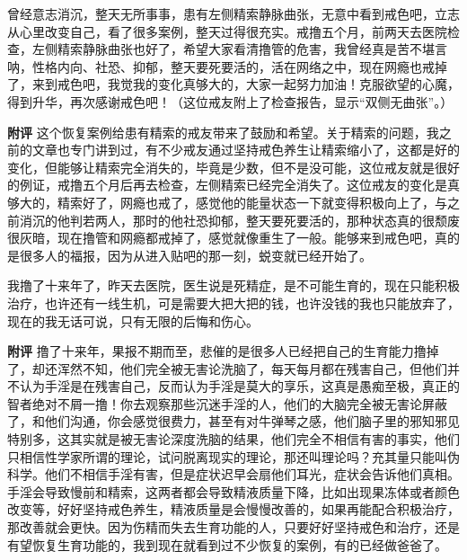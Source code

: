 \begin{case}
    曾经意志消沉，整天无所事事，患有左侧精索静脉曲张，无意中看到戒色吧，立志从心里改变自己，看了很多案例，整天过得很充实。戒撸五个月，前两天去医院检查，左侧精索静脉曲张也好了，希望大家看清撸管的危害，我曾经真是苦不堪言呐，性格内向、社恐、抑郁，整天要死要活的，活在网络之中，现在网瘾也戒掉了，来到戒色吧，我觉我的变化真够大的，大家一起努力加油！克服欲望的心魔，得到升华，再次感谢戒色吧！（这位戒友附上了检查报告，显示“双侧无曲张”。）

    \textbf{附评} 这个恢复案例给患有精索的戒友带来了鼓励和希望。关于精索的问题，我之前的文章也专门讲到过，有不少戒友通过坚持戒色养生让精索缩小了，这都是好的变化，但能够让精索完全消失的，毕竟是少数，但不是没可能，这位戒友就是很好的例证，戒撸五个月后再去检查，左侧精索已经完全消失了。这位戒友的变化是真够大的，精索好了，网瘾也戒了，感觉他的能量状态一下就变得积极向上了，与之前消沉的他判若两人，那时的他社恐抑郁，整天要死要活的，那种状态真的很颓废很灰暗，现在撸管和网瘾都戒掉了，感觉就像重生了一般。能够来到戒色吧，真的是很多人的福报，因为从进入贴吧的那一刻，蜕变就已经开始了。
\end{case}

\begin{case}
    我撸了十来年了，昨天去医院，医生说是死精症，是不可能生育的，现在只能积极治疗，也许还有一线生机，可是需要大把大把的钱，也许没钱的我也只能放弃了，现在的我无话可说，只有无限的后悔和伤心。

    \textbf{附评} 撸了十来年，果报不期而至，悲催的是很多人已经把自己的生育能力撸掉了，却还浑然不知，他们完全被无害论洗脑了，每天每月都在残害自己，但他们并不认为手淫是在残害自己，反而认为手淫是莫大的享乐，这真是愚痴至极，真正的智者绝对不屑一撸！你去观察那些沉迷手淫的人，他们的大脑完全被无害论屏蔽了，和他们沟通，你会感觉很费力，甚至有对牛弹琴之感，他们脑子里的邪知邪见特别多，这其实就是被无害论深度洗脑的结果，他们完全不相信有害的事实，他们只相信性学家所谓的理论，试问脱离现实的理论，那还叫理论吗？充其量只能叫伪科学。他们不相信手淫有害，但是症状迟早会扇他们耳光，症状会告诉他们真相。手淫会导致慢前和精索，这两者都会导致精液质量下降，比如出现果冻体或者颜色改变等，好好坚持戒色养生，精液质量是会慢慢改善的，如果再能配合积极治疗，那改善就会更快。因为伤精而失去生育功能的人，只要好好坚持戒色和治疗，还是有望恢复生育功能的，我到现在就看到过不少恢复的案例，有的已经做爸爸了。
\end{case}

